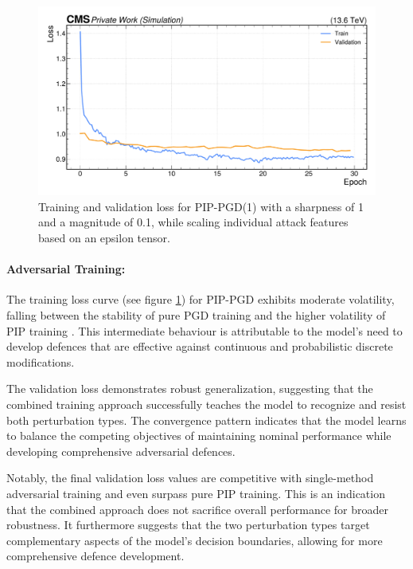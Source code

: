 \begin{figure}[H]
\centering
    \includegraphics[width=15cm]{media/output/combined_loss_validation.pdf}
    \caption{Training and validation loss for PIP-PGD(1) with a sharpness of 1 and a magnitude of 0.1, while scaling individual attack features based on an epsilon tensor.}
    \label{fig:combined_training_loss}
\end{figure}


\FloatBarrier
\paragraph{Adversarial Training:} The training loss curve (see figure \ref{fig:combined_training_loss}) for PIP-PGD exhibits moderate volatility, falling between the stability of pure PGD training and the higher volatility of PIP training . This intermediate behaviour is attributable to the model's need to develop defences that are effective against continuous and probabilistic discrete modifications.



The validation loss demonstrates robust generalization, suggesting that the combined training approach successfully teaches the model to recognize and resist both perturbation types. The convergence pattern indicates that the model learns to balance the competing objectives of maintaining nominal performance while developing comprehensive adversarial defences.

Notably, the final validation loss values are competitive with single-method adversarial training and even surpass pure PIP training. This is an indication that the combined approach does not sacrifice overall performance for broader robustness. It furthermore suggests that the two perturbation types target complementary aspects of the model's decision boundaries, allowing for more comprehensive defence development.


